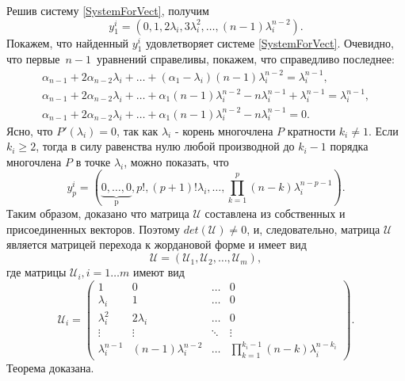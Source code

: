 Решив систему \eqref{SystemForVect}, получим
$$
y^i_1 = \left(0, 1, 2 \lambda_i, 3 \lambda_i ^2, \dots, (n-1)\lambda_i ^{n-2} \right).
$$
Покажем, что найденный $y^i_1$ удовлетворяет системе \eqref{SystemForVect}. Очевидно, что первые~$n-1$~уравнений справеливы, покажем, что справедливо последнее:
\begin{align*}
\alpha_{n-1} + 2 \alpha_{n-2} \lambda_i + \dots + (\alpha_1 - \lambda_i) (n-1) \lambda_i ^{n-2} = \lambda_i ^{n-1}, \\
\alpha_{n-1} + 2 \alpha_{n-2} \lambda_i + \dots + \alpha_1 (n-1)\lambda_i ^{n-2} - n\lambda_i^{n-1} + \lambda_i ^{n-1} = \lambda_i ^{n-1}, \\
\alpha_{n-1} + 2 \alpha_{n-2} \lambda_i + \dots + \alpha_1 (n-1)\lambda_i ^{n-2} - n\lambda_i^{n-1} = 0.
\end{align*}
Ясно, что $P'(\lambda_i) = 0$, так как $\lambda_i$ - корень многочлена $P$ кратности $k_i \ne 1$.
Если $k_i \geqslant 2$, тогда в силу равенства нулю любой производной до $k_i-1$ порядка многочлена $P$ в точке $\lambda_i$, можно показать, что
$$
y^i_p = \left(\underbrace{0, \dots, 0}_{\text{p}}, p!, (p+1)! \lambda_i, \dots, \prod_{k=1}^p(n-k)\lambda_i ^{n-p-1} \right).
$$
Таким образом, доказано что матрица $\mathcal{U}$ составлена из собственных и присоединенных векторов. Поэтому $det(\mathcal{U}) \ne 0$, и, следовательно, матрица $\mathcal{U}$ является матрицей перехода к жордановой форме и имеет вид 
$$
\mathcal{U} = \left( \mathcal{U}_1, \mathcal{U}_2, \dots, \mathcal{U}_m \right),
$$
где матрицы $\mathcal{U}_i, i=1 \dots m$ имеют вид
$$
\mathcal{U}_i = \begin{pmatrix}
1 & 0 & \dots & 0 \\
\lambda_i & 1 & \dots & 0 \\ 
\lambda_i^2 & 2\lambda_i & \dots & 0 \\
\vdots & \vdots & \ddots & \vdots \\
\lambda_i^{n-1} & (n-1)\lambda_i^{n-2} & \dots & \prod_{k=1}^{k_i-1}(n-k)\lambda_i^{n-k_i}
\end{pmatrix}.
$$
Теорема доказана.


